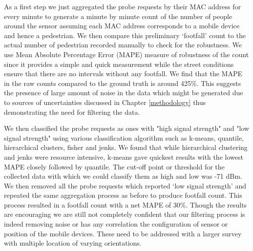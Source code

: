 As a first step we just aggregated the probe requests by their MAC address for every minute to generate a minute by minute count of the number of people around the sensor assuming each MAC address corresponds to a mobile device and hence a pedestrian.
We then compare this preliminary `footfall' count to the actual number of pedestrian recorded manually to check for the robustness. We use Mean Absolute Percentage Error (MAPE) measure of robustness of the count since it provides a simple and quick measurement while the street conditions ensure that there are no intervals without any footfall.
We find that the MAPE in the raw counts compared to the ground truth is around 425\%.
This suggests the presence of large amount of noise in the data which might be generated due to sources of uncertainties discussed in Chapter \ref{methodology} thus demonstrating the need for filtering the data.

We then classified the probe requests as ones with "high signal strength" and "low signal strength" using various classification algorithm such as k-means, quantile, hierarchical clusters, fisher and jenks.
We found that while hierarchical clustering and jenks were resource intensive, k-means gave quickest results with the lowest MAPE closely followed by quantile.
The cut-off point or threshold for the collected data with which we could classify them as high and low was -71 dBm.
We then removed all the probe requests which reported `low signal strength' and repeated the same aggregation process as before to produce footfall count. 
This process resulted in a footfall count with a net MAPE of 30\%.
Though the results are encouraging we are still not completely confident that our filtering process is indeed removing noise or has any correlation the configuration of sensor or position of the mobile devices.
These need to be addressed with a larger survey with multiple location of varying orientations.

